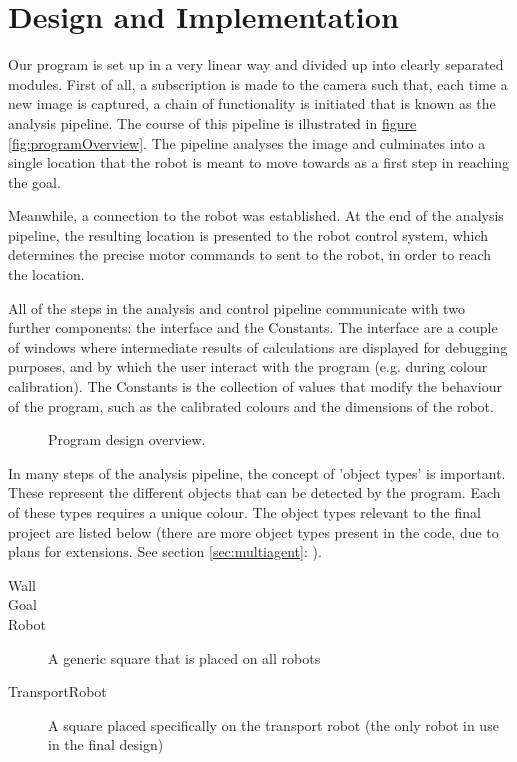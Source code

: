 \documentclass[10pt, abstracton, twocolumn]{scrartcl}
\newcommand{\fref}[1]{\hyperref[#1]{figure \vref{#1}}}
\newcommand{\sref}[1]{section \vref{#1}: \nameref{#1}}
\begin{document}
\section{Design and Implementation}
Our program is set up in a very linear way and divided up into clearly separated modules. First of all, a subscription is made to the camera such that, each time a new image is captured, a chain of functionality is initiated that is known as the analysis pipeline. The course of this pipeline is illustrated in \fref{fig:programOverview}. The pipeline analyses the image and culminates into a single location that the robot is meant to move towards as a first step in reaching the goal.

Meanwhile, a connection to the robot was established. At the end of the analysis pipeline, the resulting location is presented to the robot control system, which determines the precise motor commands to sent to the robot, in order to reach the location.

All of the steps in the analysis and control pipeline communicate with two further components: the interface and the Constants. The interface are a couple of windows where intermediate results of calculations are displayed for debugging purposes, and by which the user interact with the program (e.g. during colour calibration). The Constants is the collection of values that modify the behaviour of the program, such as the calibrated colours and the dimensions of the robot.

\begin{figure}
        \begin{center}
        
        \end{center}
        \caption{\small Program design overview.}
        \label{fig:programOverview}
\end{figure}

In many steps of the analysis pipeline, the concept of 'object types' is important. These represent the different objects that can be detected by the program. Each of these types requires a unique colour. The object types relevant to the final project are listed below (there are more object types present in the code, due to plans for extensions. See \sref{sec:multiagent}).

\begin{description}
  \item[Wall]
  \item[Goal]
  \item[Robot] A generic square that is placed on all robots
  \item[TransportRobot] A square placed specifically on the transport robot (the only robot in use in the final design)
\end{description}
\end{document}
